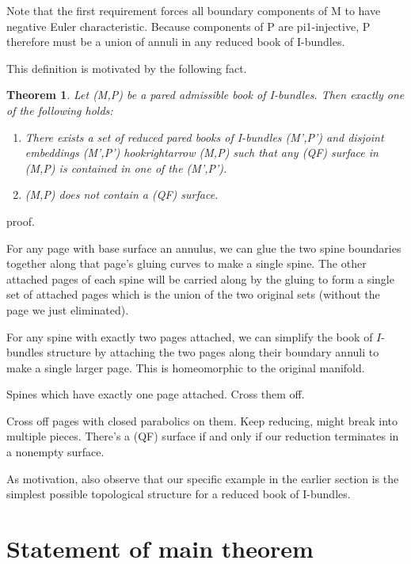 \documentclass[12pt]{amsart}
\newtheorem{thm}[theorem]{Theorem}
\theoremstyle{definition}
\theoremstyle{remark}
\begin{document}
Note that the first requirement forces all boundary components of M to have
negative Euler characteristic. Because components of P are pi1-injective,
P therefore must be a union of annuli in any reduced book of I-bundles.

This definition is motivated by the following fact.

\begin{thm}

Let (M,P) be a pared admissible book of I-bundles. Then exactly one of the
following holds:

\begin{enumerate}

\item There exists a set of reduced pared books of I-bundles (M',P') and
disjoint embeddings (M',P') hookrightarrow (M,P) such that any (QF) surface in
(M,P) is contained in one of the (M',P').

\item (M,P) does not contain a (QF) surface.

\end{enumerate}

\end{thm}

proof.

For any page with base surface an annulus, we can glue the two spine boundaries
together along that page's gluing curves to make a single spine. The other
attached pages of each spine will be carried along by the gluing to form
a single set of attached pages which is the union of the two original sets
(without the page we just eliminated).

For any spine with exactly two pages attached, we can simplify the book of
$I$-bundles structure by attaching the two pages along their boundary annuli to
make a single larger page. This is homeomorphic to the original manifold.

Spines which have exactly one page attached. Cross them off.

Cross off pages with closed parabolics on them. Keep reducing, might break into
multiple pieces. There's a (QF) surface if and only if our reduction terminates
in a nonempty surface.

As motivation, also observe that our specific example in the earlier section is
the simplest possible topological structure for a reduced book of I-bundles.

\section{Statement of main theorem}
\end{document}
